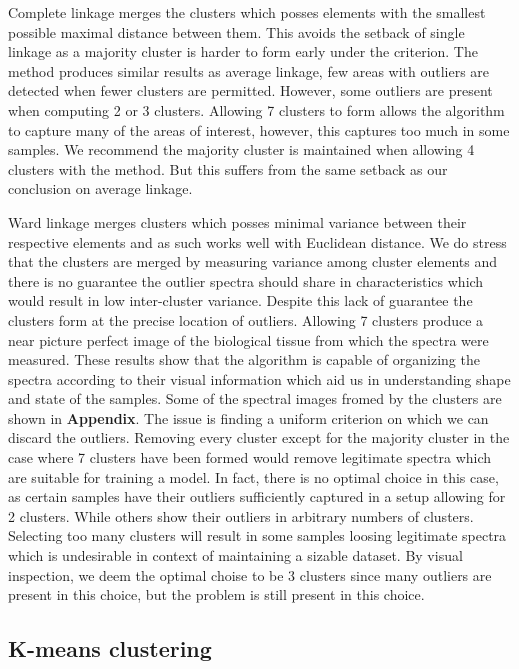 Complete linkage merges the clusters which posses elements with the smallest possible maximal distance between them. This avoids the setback of single linkage as a majority cluster is harder to form early under the criterion. The method produces similar results as average linkage, few areas with outliers are detected when fewer clusters are permitted. However, some outliers are present when computing 2 or 3 clusters. Allowing 7 clusters to form allows the algorithm to capture many of the areas of interest, however, this captures too much in some samples. We recommend the majority cluster is maintained when allowing 4 clusters with the method. But this suffers from the same setback as our conclusion on average linkage.

Ward linkage merges clusters which posses minimal variance between their respective elements and as such works well with Euclidean distance. We do stress that the clusters are merged by measuring variance among cluster elements and there is no guarantee the outlier spectra should share in characteristics which would result in low inter-cluster variance. Despite this lack of guarantee the clusters form at the precise location of outliers. Allowing 7 clusters produce a near picture perfect image of the biological tissue from which the spectra were measured. These results show that the algorithm is capable of organizing the spectra according to their visual information which aid us in understanding shape and state of the samples. Some of the spectral images fromed by the clusters are shown in \textbf{Appendix}. The issue is finding a uniform criterion on which we can discard the outliers. Removing every cluster except for the majority cluster in the case where 7 clusters have been formed would remove legitimate spectra which are suitable for training a model. In fact, there is no optimal choice in this case, as certain samples have their outliers sufficiently captured in a setup allowing for 2 clusters. While others show their outliers in arbitrary numbers of clusters. Selecting too many clusters will result in some samples loosing legitimate spectra which is undesirable in context of maintaining a sizable dataset. By visual inspection, we deem the optimal choise to be 3 clusters since many outliers are present in this choice, but the problem is still present in this choice.

\subsection{K-means clustering}


